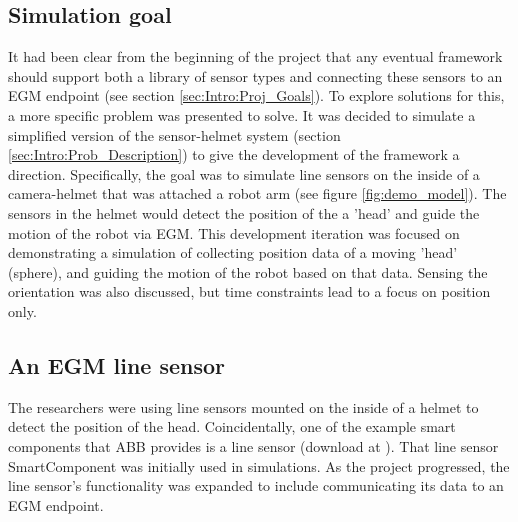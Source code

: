 \documentclass{cslthse-msc}
\begin{document}
\subsection{Simulation goal}
\label{sec:Dev:I2:demo_goal}
It had been clear from the beginning of the project that any eventual framework should support both a library of sensor types and connecting these sensors to an EGM endpoint (see section \ref{sec:Intro:Proj_Goals}). To explore solutions for this, a more specific problem was presented to solve. It was decided to simulate a simplified version of the sensor-helmet system (section \ref{sec:Intro:Prob_Description}) to give the development of the framework a direction. Specifically, the goal was to simulate line sensors on the inside of a camera-helmet that was attached a robot arm (see figure \ref{fig:demo_model}). The sensors in the helmet would detect the position of the a 'head' and guide the motion of the robot via EGM. This development iteration was focused on demonstrating a simulation of collecting position data of a moving 'head' (sphere), and guiding the motion of the robot based on that data. Sensing the  orientation was also discussed, but time constraints lead to a focus on position only. \par
 
 \subsection{An EGM line sensor}
 \label{sec:Dev:I2:egm_line_sensor}
The researchers were using line sensors mounted on the inside of a helmet to detect the position of the head. Coincidentally, one of the example smart components that ABB provides is a line sensor (download at \cite{ABB:Line_Sensor}). That line sensor SmartComponent was initially used in simulations. As the project progressed, the line sensor's functionality was expanded to include communicating its data to an EGM endpoint. 
\end{document}
